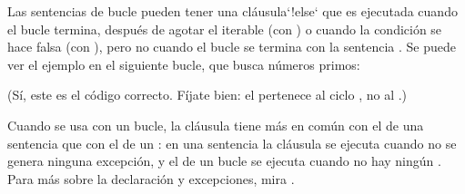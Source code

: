 \documentclass[a5paper,10pt,spanish]{sphinxmanual}
\begin{document}
\sphinxAtStartPar
Las sentencias de bucle pueden tener una cláusula`!else` que es ejecutada cuando el bucle termina, después de agotar el iterable (con ) o cuando la condición se hace falsa (con ), pero no cuando el bucle se termina con la sentencia . Se puede ver el ejemplo en el siguiente bucle, que busca números primos:

\begin{sphinxVerbatim}[commandchars=\\\{\}]
    
        
             
                
            
    
        
         
\end{sphinxVerbatim}

\sphinxAtStartPar
(Sí, este es el código correcto. Fíjate bien: el  pertenece al ciclo , no al .)

\sphinxAtStartPar
Cuando se usa con un bucle, la cláusula  tiene más en común con el  de una sentencia  que con el de un : en una sentencia  la cláusula  se ejecuta cuando no se genera ninguna excepción, y el  de un bucle se ejecuta cuando no hay ningún . Para más sobre la declaración  y excepciones, mira {\hyperref[\detokenize{tutorial/errors:tut-handling}]{}}.
\end{document}
